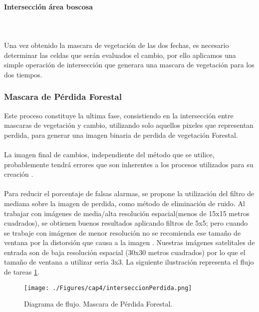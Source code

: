 \paragraph{Intersecci\'on \'area boscosa }\mbox{}\\\mbox{}\\
Una vez obtenido la mascara de vegetaci\'on de las dos fechas, es necesario determinar las celdas que ser\'an evaluados el cambio, por ello aplicamos una simple operaci\'on de intersecci\'on que generara una mascara de vegetaci\'on para los dos tiempos.

\subsubsection{Mascara de P\'erdida Forestal}
Este proceso constituye la ultima fase, consistiendo en la intersecci\'on entre mascaras de vegetaci\'on y cambio, utilizando solo aquellos pixeles que representan perdida, para generar una imagen binaria de perdida de vegetaci\'on Forestal.\\~\\
La imagen final de cambios, independiente del método que se utilice, probablemente tendrá errores que son inherentes a los procesos utilizados para su creación \cite{lovell2001filtering}. \\~\\
Para reducir el porcentaje de falsas alarmas, se propone la utilización del filtro de mediana sobre la imagen de perdida, como m\'etodo de eliminación de ruido. Al trabajar con im\'agenes de media/alta resoluci\'on espacial(menos de 15x15 metros cuadrados), se obtienen buenos resultados aplicando filtros de 5x5; pero cuando se trabaje con im\'agenes de menor resoluci\'on no se recomienda ese tama\~{n}o de ventana por la distorsi\'on que causa a la imagen \cite{martinez2013normalizacion}. Nuestras im\'agenes satelitales de entrada son de baja resoluci\'on espacial (30x30 metros cuadrados) por lo que el tama\~{n}o de ventana a utilizar seria 3x3.
La siguiente ilustraci\'on representa el flujo de tareas \ref{fig:intersPerdida}.
\begin{figure}[H]
	\centering
	\texttt{[image: ./Figures/cap4/interseccionPerdida.png]}
	\caption{Diagrama de flujo. Mascara de P\'erdida Forestal.}
	\label{fig:intersPerdida}
\end{figure}

